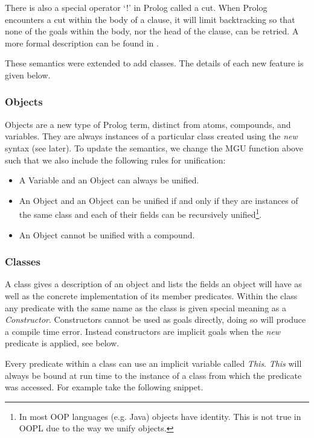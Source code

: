 \documentclass[12pt,a4paper,twoside,openright]{report}
\begin{document}
\bigskip

There is also a special operator `!' in Prolog called a cut. When Prolog encounters a cut within the body of a clause, it will limit backtracking so that none of the goals within the body, nor the head of the clause, can be retried. A more formal description can be found in \cite{MYCROFT}.

\bigskip

These semantics were extended to add classes. The details of each new feature is given below.

\subsubsection {Objects}

Objects are a new type of Prolog term, distinct from atoms, compounds, and variables. They are always instances of a particular class created using the \emph{new} syntax (see later). To update the semantics, we change the MGU function above such that we also include the following rules for unification:

\begin{itemize}
	\item A Variable and an Object can always be unified.
	\item An Object and an Object can be unified if and only if they are instances of the same class and each of their fields can be recursively unified\footnote{In most OOP languages (e.g. Java) objects have identity. This is not true in OOPL due to the way we unify objects.}.
	\item An Object cannot be unified with a compound.
\end{itemize}

\subsubsection {Classes}

A class gives a description of an object and lists the fields an object will have as well as the concrete implementation of its member predicates. Within the class any predicate with the same name as the class is given special meaning as a \emph{Constructor}. Constructors cannot be used as goals directly, doing so will produce a compile time error. Instead constructors are implicit goals when the \emph{new} predicate is applied, see below.

\bigskip

Every predicate within a class can use an implicit variable called \emph{This}. \emph{This} will always be bound at run time to the instance of a class from which the predicate was accessed. For example take the following snippet.
\end{document}
